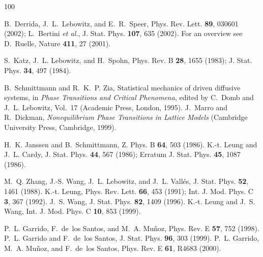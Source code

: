 \documentclass[aps,prl,twocolumn,floatfix,amssymb]{revtex4}
\begin{document}
 
\begin{thebibliography}{100} 
 
B.~Derrida, J.~L.~Lebowitz, and E.~R.~Speer, 
Phys. Rev. Lett. {\bf 89}, 030601 (2002); 
L.~Bertini {\em et al.}, 
J. Stat. Phys. {\bf 107}, 635 (2002). 
For an overview see D.~Ruelle, Nature {\bf 411}, 27 (2001). 
 
S.~Katz, J.~L. Lebowitz, and H.~Spohn, 
Phys. Rev. B {\bf 28}, 1655 (1983); 
J. Stat. Phys. {\bf 34}, 497 (1984). 
 
B.~Schmittmann and R.~K.~P. Zia, 
Statistical mechanics of driven diffusive systems, 
in {\em Phase Transitions and Critical Phenomena}, 
edited by C.~Domb and J.~L. Lebowitz, Vol.~17 
(Academic Press, London, 1995). 
J.~Marro and R.~Dickman, 
{\em Nonequilibrium Phase Transitions in Lattice Models} 
(Cambridge University Press, Cambridge, 1999). 
 
H.~K. Janssen and B.~Schmittmann, 
Z. Phys. B {\bf 64}, 503 (1986). 
K.-t. Leung and J.~L. Cardy, 
J. Stat. Phys. {\bf 44}, 567 (1986); 
Erratum J. Stat. Phys. {\bf 45}, 1087 (1986). 
 
M.~Q. Zhang, J.-S. Wang, J.~L. Lebowitz, and J.~L. Vall\'es, 
\newblock J. Stat. Phys. {\bf 52}, 1461 (1988). 
K.-t. Leung, 
\newblock Phys. Rev. Lett. {\bf 66}, 453 (1991); 
\newblock Int. J. Mod. Phys. C {\bf 3}, 367 (1992). 
J.~S. Wang, 
\newblock J. Stat. Phys. {\bf 82}, 1409 (1996). 
K.-t. Leung and J.~S. Wang, 
\newblock Int. J. Mod. Phys. C {\bf 10}, 853 (1999). 
 
P.~L. Garrido, F.~de~los Santos, and M.~A. Mu{\~n}oz, 
Phys. Rev. E {\bf 57}, 752 (1998). 
P.~L. Garrido and F.~de~los Santos, 
J. Stat. Phys. {\bf 96}, 303 (1999). 
P.~L. Garrido, M.~A. Mu{\~n}oz, and F.~de~los Santos, 
Phys. Rev. E {\bf 61}, R4683 (2000). 
 

\end{thebibliography}
\end{document}
